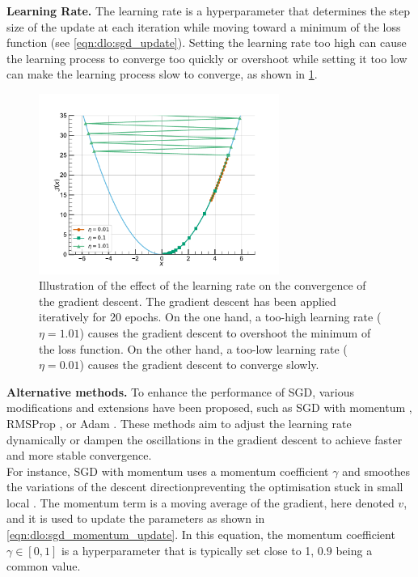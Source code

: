 \noindent \textbf{Learning Rate.} The learning rate is a hyperparameter that
determines the step size of the update at each iteration while moving toward a
minimum of the loss function (see \cref{eqn:dlo:sgd_update}). Setting the
learning rate too high can cause the learning process to converge too quickly or
overshoot while setting it too low can make the learning process slow to
converge, as shown in \cref{fig:dlo:gradient_descent}.\\

\begin{figure}[htbp]
  \centering
  \includegraphics[width=0.7\textwidth]{chapter_dlo/assets/gradient_descent.pdf}
  \caption{Illustration of the effect of the learning rate on the convergence of
    the gradient descent. The gradient descent has been applied iteratively for
    20 epochs. On the one hand, a too-high learning rate ($\eta=1.01$) causes
    the gradient descent to overshoot the minimum of the loss function. On the
    other hand, a too-low learning rate ($\eta=0.01$) causes the gradient
    descent to converge slowly.}
  \label{fig:dlo:gradient_descent}
\end{figure}

\noindent \textbf{Alternative methods.} To enhance the performance of \ac{SGD},
various modifications and extensions have been proposed, such as \ac{SGD} with
momentum \cite{sutskever2013importance,polyak1964some}, RMSProp
\cite{hinton2012neural}, or Adam \cite{kingma2014adam}. These methods aim to
adjust the learning rate dynamically or dampen the oscillations in the gradient
descent to achieve faster and more stable convergence.\\

For instance, \ac{SGD} with momentum
\cite{sutskever2013importance,polyak1964some} uses a momentum coefficient
$\gamma$ and smoothes the variations of the descent direction\DIFdelbegin {}\DIFdelend \DIFaddbegin {}\DIFaddend preventing
the optimisation \DIFdelbegin {}\DIFdelend \DIFaddbegin {}\DIFaddend stuck in small local \DIFdelbegin {}\DIFdelend \DIFaddbegin {}\DIFaddend . The momentum term is
a moving average of the gradient, here denoted $v$, and it is used to update the
parameters as shown in \cref{eqn:dlo:sgd_momentum_update}. In this equation, the
momentum coefficient $\gamma \in [0,1]$ is a hyperparameter that is typically
set close to 1, $0.9$ being a common value.\\

